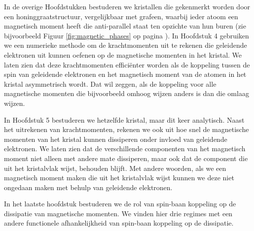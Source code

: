 In de overige Hoofdstukken bestuderen we kristallen die gekenmerkt worden door een honinggraatstructuur, vergelijkbaar met grafeen, waarbij ieder atoom een magnetisch moment heeft die anti-parallel staat ten opzichte van hun buren (zie bijvoorbeeld Figuur \ref{fig:magnetic_phases} op pagina \pageref{fig:magnetic_phases}). In Hoofdstuk 4 gebruiken we een numerieke methode om de krachtmomenten uit te rekenen die geleidende elektronen uit kunnen oefenen op de magnetische momenten in het kristal. We laten zien dat deze krachtmomenten efficiënter worden als de koppeling tussen de spin van geleidende elektronen en het magnetisch moment van de atomen in het kristal asymmetrisch wordt. Dat wil zeggen, als de koppeling voor alle magnetische momenten die bijvoorbeeld omhoog wijzen anders is dan die omlaag wijzen. 

In Hoofdstuk 5 bestuderen we hetzelfde kristal, maar dit keer analytisch. Naast het uitrekenen van krachtmomenten, rekenen we ook uit hoe snel de magnetische momenten van het kristal kunnen dissiperen onder invloed van geleidende elektronen. We laten zien dat de verschillende componenten van het magnetisch moment niet alleen met andere mate dissiperen, maar ook dat de component die uit het kristalvlak wijst, behouden blijft. Met andere woorden, als we een magnetisch moment maken die uit het kristalvlak wijst kunnen we deze niet ongedaan maken met behulp van geleidende elektronen. 

In het laatste hoofdstuk bestuderen we de rol van spin-baan koppeling op de dissipatie van magnetische momenten. We vinden hier drie regimes met een andere functionele afhankelijkheid van spin-baan koppeling op de dissipatie.   
